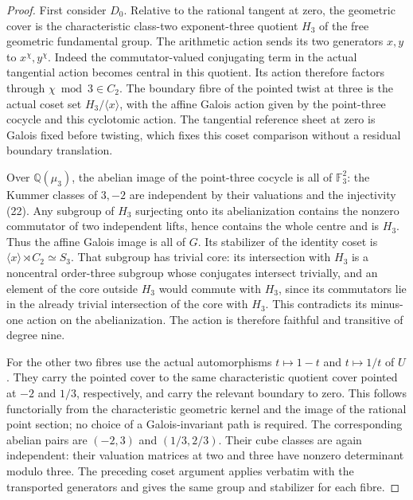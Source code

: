 \begin{proof}
First consider \(D_0\). Relative to the rational
tangent at zero, the geometric cover is the
characteristic class-two exponent-three quotient
\(H_3\) of the free geometric fundamental group.
The arithmetic action sends its two generators
\(x,y\) to \(x^\chi,y^\chi\). Indeed the
commutator-valued conjugating term in the actual
tangential action becomes central in this quotient.
Its action therefore factors through
\(\chi\bmod3\in C_2\).
The boundary fibre of the pointed twist at three
is the actual coset set \(H_3/\langle x\rangle\),
with the affine Galois action given by the
point-three cocycle and this cyclotomic action.
The tangential reference sheet at zero is Galois
fixed before twisting, which fixes this coset
comparison without a residual boundary translation.

Over \(\mathbb Q(\mu_3)\), the abelian image of
the point-three cocycle is all of \(\mathbb F_3^2\):
the Kummer classes of \(3,-2\) are independent
by their valuations and the injectivity (22).
Any subgroup of \(H_3\) surjecting onto its
abelianization contains the nonzero commutator
of two independent lifts, hence contains the
whole centre and is \(H_3\). Thus the affine
Galois image is all of \(G\). Its stabilizer of
the identity coset is
\(\langle x\rangle\rtimes C_2\simeq S_3\).
That subgroup has trivial core: its intersection
with \(H_3\) is a noncentral order-three subgroup
whose conjugates intersect trivially, and an
element of the core outside \(H_3\) would commute
with \(H_3\), since its commutators lie in the
already trivial intersection of the core with
\(H_3\). This contradicts its minus-one action
on the abelianization. The action is therefore faithful
and transitive of degree nine.

For the other two fibres use the actual automorphisms
\(t\mapsto1-t\) and \(t\mapsto1/t\) of \(U\).
They carry the pointed cover to the same
characteristic quotient cover pointed at \(-2\)
and \(1/3\), respectively, and carry the relevant
boundary to zero. This follows functorially from
the characteristic geometric kernel and the
image of the rational point section; no choice
of a Galois-invariant path is required.
The corresponding abelian pairs are \((-2,3)\)
and \((1/3,2/3)\). Their cube classes are again
independent: their valuation matrices at two
and three have nonzero determinant modulo three.
The preceding coset argument applies verbatim
with the transported generators and gives the
same group and stabilizer for each fibre.


\end{proof}

